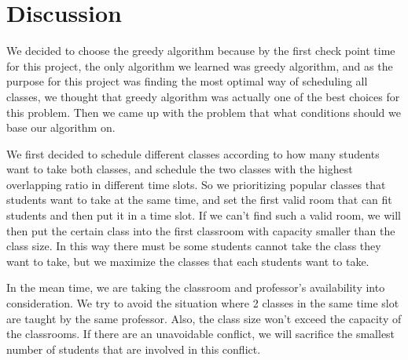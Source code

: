 \documentclass[11pt, oneside]{article}   	%
\begin{document}


\section{Discussion}
We decided to choose the greedy algorithm because by the first check point time for this project, the only algorithm we learned was greedy algorithm, and as the purpose for this project was finding the most optimal way of scheduling all classes, we thought that greedy algorithm was actually one of the best choices for this problem. Then we came up with the problem that what conditions should we base our algorithm on.

We first decided to schedule different classes according to how many students want to take both classes, and schedule the two classes with the highest overlapping ratio in different time slots. So we prioritizing popular classes that students want to take at the same time, and set the first valid room that can fit students and then put it in a time slot. If we can't find such a valid room, we will then put the certain class into the first classroom with capacity smaller than the class size. In this way there must be some students cannot take the class they want to take, but we maximize the classes that each students want to take.

In the mean time, we are taking the classroom and professor's availability into consideration. We try to avoid the situation where 2 classes in the same time slot are taught by the same professor. Also, the class size won't exceed the capacity of the classrooms. If there are an unavoidable conflict, we will sacrifice the smallest number of students that are involved in this conflict.
\end{document}
